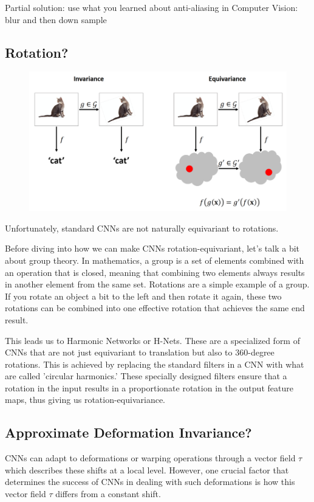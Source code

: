 \documentclass[11pt]{article}
\begin{document}
Partial solution: use what you learned about anti-aliasing in Computer Vision: blur and then down sample

\subsection{Rotation?}

\begin{figure}[H]
    \centering
    \includegraphics[width=.6\linewidth]{figures/cat-rotation.png}
\end{figure}

Unfortunately, standard CNNs are not naturally equivariant to rotations.

Before diving into how we can make CNNs rotation-equivariant, let's talk a bit about group theory. In mathematics, a group is a set of elements combined with an operation that is closed, meaning that combining two elements always results in another element from the same set. Rotations are a simple example of a group. If you rotate an object a bit to the left and then rotate it again, these two rotations can be combined into one effective rotation that achieves the same end result.

This leads us to Harmonic Networks or H-Nets. These are a specialized form of CNNs that are not just equivariant to translation but also to 360-degree rotations. This is achieved by replacing the standard filters in a CNN with what are called 'circular harmonics.' These specially designed filters ensure that a rotation in the input results in a proportionate rotation in the output feature maps, thus giving us rotation-equivariance.

\subsection{Approximate Deformation Invariance?}

CNNs can adapt to deformations or warping operations through a vector field $\tau$ which describes these shifts at a local level. However, one crucial factor that determines the success of CNNs in dealing with such deformations is how this vector field $\tau$ differs from a constant shift.
\end{document}
